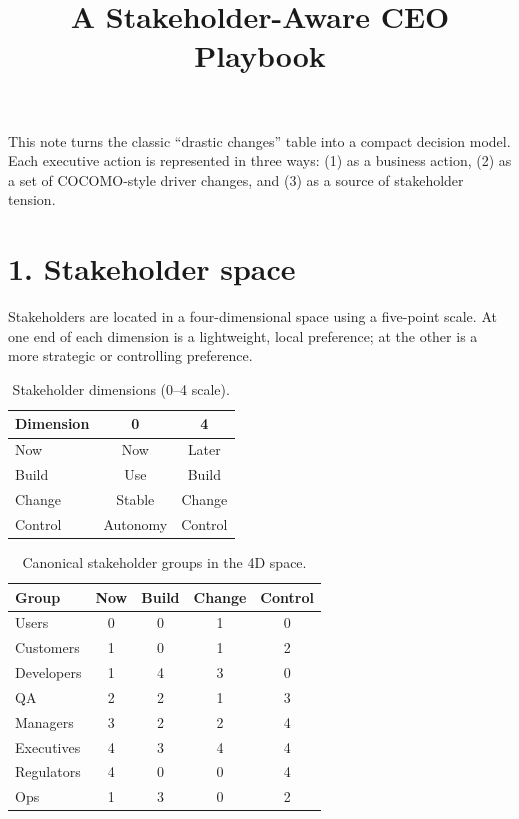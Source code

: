 \documentclass[11pt]{article}
\title{A Stakeholder-Aware CEO Playbook}
\author{}
\date{}
\begin{document}
\maketitle
\thispagestyle{empty}

This note turns the classic ``drastic changes'' table into a compact decision model.
Each executive action is represented in three ways:
(1) as a business action,
(2) as a set of COCOMO-style driver changes, and
(3) as a source of stakeholder tension.

\section*{1. Stakeholder space}
Stakeholders are located in a four-dimensional space using a five-point scale.
At one end of each dimension is a lightweight, local preference; at the other is a more strategic or controlling preference.

\begin{table}[h!]
\centering
\small
\begin{tabular}{lcc}
\toprule
Dimension & 0 & 4 \\
\midrule
Now     & Now      & Later \\
Build   & Use      & Build \\
Change  & Stable   & Change \\
Control & Autonomy & Control \\
\bottomrule
\end{tabular}
\caption{Stakeholder dimensions (0--4 scale).}
\end{table}

\begin{table}[h!]
\centering
\small
\begin{tabular}{lcccc}
\toprule
Group & Now & Build & Change & Control \\
\midrule
Users       & 0 & 0 & 1 & 0 \\
Customers   & 1 & 0 & 1 & 2 \\
Developers  & 1 & 4 & 3 & 0 \\
QA          & 2 & 2 & 1 & 3 \\
Managers    & 3 & 2 & 2 & 4 \\
Executives  & 4 & 3 & 4 & 4 \\
Regulators  & 4 & 0 & 0 & 4 \\
Ops         & 1 & 3 & 0 & 2 \\
\bottomrule
\end{tabular}
\caption{Canonical stakeholder groups in the 4D space.}
\end{table}
\end{document}
